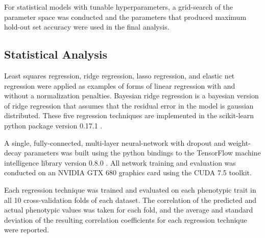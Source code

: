 \documentclass[9pt,twocolumn,twoside]{g3_article/gsag3jnl}
\begin{document}
{For statistical models with tunable hyperparameters, a grid-search of the parameter 
space was conducted and the parameters that produced maximum hold-out set accuracy 
were used in the final analysis. 


\subsection*{Statistical Analysis} 

Least squares regression, ridge regression, lasso regression, and elastic net regression were applied as examples of
forms of linear regression with and without a normalization penalties. Bayesian ridge regression is a bayesian
version of ridge regression that assumes that the residual error in the model is gaussian distributed. These
five regression techniques are implemented in the scikit-learn python package version 0.17.1 \citep{scikit-learn}.

A single, fully-connected, multi-layer neural-network with dropout and weight-decay parameters was built using 
the python bindings to the TensorFlow machine intelligence library version 0.8.0 \citep{tensorflow2015}. All network training
and evaluation was conducted on an NVIDIA GTX 680 graphics card using the CUDA 7.5 toolkit. 

Each regression technique was trained and evaluated on each phenotypic trait in all 10 cross-validation folds of each dataset.
The correlation of the predicted and actual phenotypic values was taken for each fold, and the average and 
standard deviation of the resulting correlation coefficients for each regression technique were reported.
 

}
\end{document}

